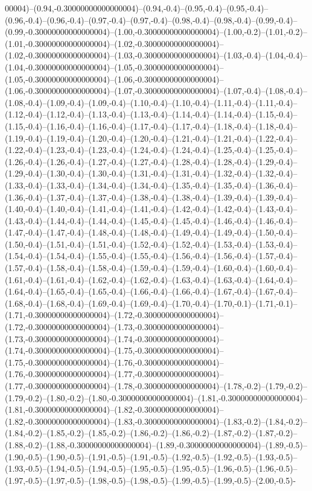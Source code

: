 00004)--(0.94,-0.30000000000000004)--(0.94,-0.4)--(0.95,-0.4)--(0.95,-0.4)--(0.96,-0.4)--(0.96,-0.4)--(0.97,-0.4)--(0.97,-0.4)--(0.98,-0.4)--(0.98,-0.4)--(0.99,-0.4)--(0.99,-0.30000000000000004)--(1.00,-0.30000000000000004)--(1.00,-0.2)--(1.01,-0.2)--(1.01,-0.30000000000000004)--(1.02,-0.30000000000000004)--(1.02,-0.30000000000000004)--(1.03,-0.30000000000000004)--(1.03,-0.4)--(1.04,-0.4)--(1.04,-0.30000000000000004)--(1.05,-0.30000000000000004)--(1.05,-0.30000000000000004)--(1.06,-0.30000000000000004)--(1.06,-0.30000000000000004)--(1.07,-0.30000000000000004)--(1.07,-0.4)--(1.08,-0.4)--(1.08,-0.4)--(1.09,-0.4)--(1.09,-0.4)--(1.10,-0.4)--(1.10,-0.4)--(1.11,-0.4)--(1.11,-0.4)--(1.12,-0.4)--(1.12,-0.4)--(1.13,-0.4)--(1.13,-0.4)--(1.14,-0.4)--(1.14,-0.4)--(1.15,-0.4)--(1.15,-0.4)--(1.16,-0.4)--(1.16,-0.4)--(1.17,-0.4)--(1.17,-0.4)--(1.18,-0.4)--(1.18,-0.4)--(1.19,-0.4)--(1.19,-0.4)--(1.20,-0.4)--(1.20,-0.4)--(1.21,-0.4)--(1.21,-0.4)--(1.22,-0.4)--(1.22,-0.4)--(1.23,-0.4)--(1.23,-0.4)--(1.24,-0.4)--(1.24,-0.4)--(1.25,-0.4)--(1.25,-0.4)--(1.26,-0.4)--(1.26,-0.4)--(1.27,-0.4)--(1.27,-0.4)--(1.28,-0.4)--(1.28,-0.4)--(1.29,-0.4)--(1.29,-0.4)--(1.30,-0.4)--(1.30,-0.4)--(1.31,-0.4)--(1.31,-0.4)--(1.32,-0.4)--(1.32,-0.4)--(1.33,-0.4)--(1.33,-0.4)--(1.34,-0.4)--(1.34,-0.4)--(1.35,-0.4)--(1.35,-0.4)--(1.36,-0.4)--(1.36,-0.4)--(1.37,-0.4)--(1.37,-0.4)--(1.38,-0.4)--(1.38,-0.4)--(1.39,-0.4)--(1.39,-0.4)--(1.40,-0.4)--(1.40,-0.4)--(1.41,-0.4)--(1.41,-0.4)--(1.42,-0.4)--(1.42,-0.4)--(1.43,-0.4)--(1.43,-0.4)--(1.44,-0.4)--(1.44,-0.4)--(1.45,-0.4)--(1.45,-0.4)--(1.46,-0.4)--(1.46,-0.4)--(1.47,-0.4)--(1.47,-0.4)--(1.48,-0.4)--(1.48,-0.4)--(1.49,-0.4)--(1.49,-0.4)--(1.50,-0.4)--(1.50,-0.4)--(1.51,-0.4)--(1.51,-0.4)--(1.52,-0.4)--(1.52,-0.4)--(1.53,-0.4)--(1.53,-0.4)--(1.54,-0.4)--(1.54,-0.4)--(1.55,-0.4)--(1.55,-0.4)--(1.56,-0.4)--(1.56,-0.4)--(1.57,-0.4)--(1.57,-0.4)--(1.58,-0.4)--(1.58,-0.4)--(1.59,-0.4)--(1.59,-0.4)--(1.60,-0.4)--(1.60,-0.4)--(1.61,-0.4)--(1.61,-0.4)--(1.62,-0.4)--(1.62,-0.4)--(1.63,-0.4)--(1.63,-0.4)--(1.64,-0.4)--(1.64,-0.4)--(1.65,-0.4)--(1.65,-0.4)--(1.66,-0.4)--(1.66,-0.4)--(1.67,-0.4)--(1.67,-0.4)--(1.68,-0.4)--(1.68,-0.4)--(1.69,-0.4)--(1.69,-0.4)--(1.70,-0.4)--(1.70,-0.1)--(1.71,-0.1)--(1.71,-0.30000000000000004)--(1.72,-0.30000000000000004)--(1.72,-0.30000000000000004)--(1.73,-0.30000000000000004)--(1.73,-0.30000000000000004)--(1.74,-0.30000000000000004)--(1.74,-0.30000000000000004)--(1.75,-0.30000000000000004)--(1.75,-0.30000000000000004)--(1.76,-0.30000000000000004)--(1.76,-0.30000000000000004)--(1.77,-0.30000000000000004)--(1.77,-0.30000000000000004)--(1.78,-0.30000000000000004)--(1.78,-0.2)--(1.79,-0.2)--(1.79,-0.2)--(1.80,-0.2)--(1.80,-0.30000000000000004)--(1.81,-0.30000000000000004)--(1.81,-0.30000000000000004)--(1.82,-0.30000000000000004)--(1.82,-0.30000000000000004)--(1.83,-0.30000000000000004)--(1.83,-0.2)--(1.84,-0.2)--(1.84,-0.2)--(1.85,-0.2)--(1.85,-0.2)--(1.86,-0.2)--(1.86,-0.2)--(1.87,-0.2)--(1.87,-0.2)--(1.88,-0.2)--(1.88,-0.30000000000000004)--(1.89,-0.30000000000000004)--(1.89,-0.5)--(1.90,-0.5)--(1.90,-0.5)--(1.91,-0.5)--(1.91,-0.5)--(1.92,-0.5)--(1.92,-0.5)--(1.93,-0.5)--(1.93,-0.5)--(1.94,-0.5)--(1.94,-0.5)--(1.95,-0.5)--(1.95,-0.5)--(1.96,-0.5)--(1.96,-0.5)--(1.97,-0.5)--(1.97,-0.5)--(1.98,-0.5)--(1.98,-0.5)--(1.99,-0.5)--(1.99,-0.5)--(2.00,-0.5)-